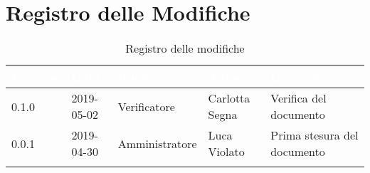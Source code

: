 \newpage

\section*{Registro delle Modifiche}

\begin{center}
\begin{longtable}[c]{|m{}|m{}|m{}|m{}|p{}|}
\hline
\rowcolor{bluelogo}\textbf{\textcolor{white}{Versione}} & \textbf{\textcolor{white}{Data}} & \textbf{\textcolor{white}{Ruolo}} & \textbf{\textcolor{white}{Autore}} & \textbf{\textcolor{white}{Descrizione}}\\
\endfirsthead
\hline \hline
\rowcolor{grigio} 0.1.0 & 2019-05-02 & Verificatore & Carlotta Segna & Verifica del documento \\
\hline
0.0.1 & 2019-04-30 & Amministratore & Luca Violato & Prima stesura del documento\\
\hline
\caption{Registro delle modifiche}
\end{longtable}
\end{center}
